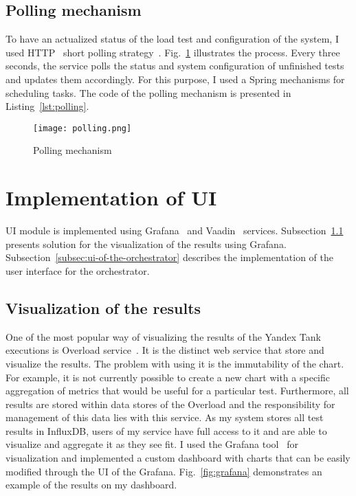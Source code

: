 \subsection{Polling mechanism}\label{subsec:polling_mechanism}
To have an actualized status of the load test and configuration of the system, I used HTTP~\cite{http} short polling strategy~\cite{http_polling}.
Fig.~\ref{fig:polling} illustrates the process. Every three seconds, the service polls the status and system configuration of unfinished tests and updates them accordingly.
For this purpose, I used a Spring mechanisms for scheduling tasks. The code of the polling mechanism is presented in Listing~\ref{lst:polling}.
\begin{figure}[t]
    \centering
    \texttt{[image: polling.png]}
    \caption{Polling mechanism}
    \label{fig:polling}
\end{figure}

\begin{flushright}
\begin{minipage}{\textwidth}
    
\end{minipage}
\end{flushright}


\section{Implementation of UI}\label{sec:implementation-of-ui}
UI module is implemented using Grafana~\cite{grafana} and Vaadin~\cite{vaadin} services.
Subsection~\ref{subsec:visualization-of-the-results} presents solution for the visualization of the results using Grafana.
Subsection~\ref{subsec:ui-of-the-orchestrator} describes the implementation of the user interface for the orchestrator.

\subsection{Visualization of the results}\label{subsec:visualization-of-the-results}
One of the most popular way of visualizing the results of the Yandex Tank executions is Overload service~\cite{overload}. It is the distinct web service that store and visualize the results. The problem with using it is the immutability of the chart.
For example, it is not currently possible to create a new chart with a specific aggregation of metrics that would be useful for a particular test. Furthermore, all results are stored within data stores of the Overload and the responsibility for management of this data lies with this service.
As my system stores all test results in InfluxDB, users of my service have full access to it and are able to visualize and aggregate it as they see fit.
I used the Grafana tool~\cite{grafana} for visualization and implemented a custom dashboard with charts that can be easily modified through the UI of the Grafana. Fig.~\ref{fig:grafana} demonstrates an example of the results on my dashboard.

